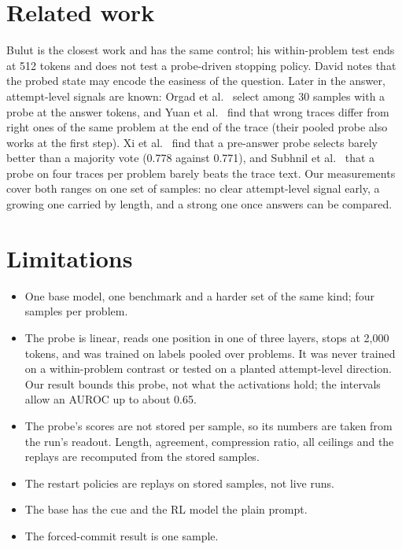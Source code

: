 \documentclass[10pt]{article}
\begin{document}
\section{Related work}

Bulut \cite{bulut2026problem} is the closest work and has the same control; his within-problem test ends at 512
tokens and does not test a probe-driven stopping policy. David \cite{david2025temporal} notes that the probed
state may encode the easiness of the question. Later in the answer, attempt-level signals are known: Orgad et
al.\ \cite{orgad2024llms} select among 30 samples with a probe at the answer tokens, and Yuan et al.\
\cite{yuan2026hidden} find that wrong traces differ from right ones of the same problem at the end of the trace
(their pooled probe also works at the first step). Xi et al.\ \cite{xi2026calibration} find that a pre-answer
probe selects barely better than a majority vote (0.778 against 0.771), and Subhnil et al.\
\cite{subhnil2026effectiveness} that a probe on four traces per problem barely beats the trace text. Our
measurements cover both ranges on one set of samples: no clear attempt-level signal early, a growing one
carried by length, and a strong one once answers can be compared.

\section{Limitations}

\begin{itemize}
\item One base model, one benchmark and a harder set of the same kind; four samples per problem.
\item The probe is linear, reads one position in one of three layers, stops at 2{,}000 tokens, and was trained on
labels pooled over problems. It was never trained on a within-problem contrast or tested on a planted
attempt-level direction. Our result bounds this probe, not what the activations hold; the intervals allow an
AUROC up to about 0.65.
\item The probe's scores are not stored per sample, so its numbers are taken from the run's readout. Length,
agreement, compression ratio, all ceilings and the replays are recomputed from the stored samples.
\item The restart policies are replays on stored samples, not live runs.
\item The base has the cue and the RL model the plain prompt.
\item The forced-commit result is one sample.
\end{itemize}
\end{document}
